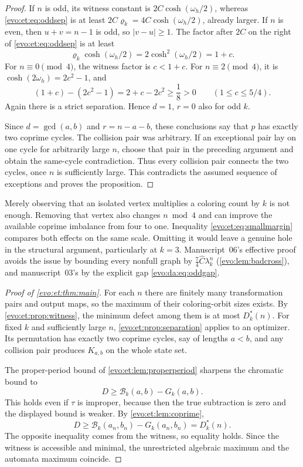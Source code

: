 \documentclass[11pt,a4paper]{article}
\numberwithin{equation}{section}
\theoremstyle{definition}
\theoremstyle{remark}
\newcommand{\Bip}{\mathcal B}
\begin{document}
\begin{proof}
If $n$ is odd, its witness constant is $2C\cosh(\omega_h/2)$, whereas
\eqref{evo:et:eq:oddsep} is at least $2C\varrho_k=4C\cosh(\omega_h/2)$, already
larger. If $n$ is even, then $u+v=n-1$ is odd, so $|v-u|\ge1$. The factor after
$2C$ on the right of \eqref{evo:et:eq:oddsep} is at least
\[
 \varrho_k\cosh(\omega_h/2)=2\cosh^2(\omega_h/2)=1+c.
\]
For $n\equiv0\pmod4$, the witness factor is $c<1+c$. For $n\equiv2\pmod4$, it
is $\cosh(2\omega_h)=2c^2-1$, and
\begin{equation}\label{evo:et:eq:smallmargin}
 (1+c)-(2c^2-1)=2+c-2c^2\ge\frac18>0
 \qquad(1\le c\le5/4).
\end{equation}
Again there is a strict separation. Hence $d=1$, $r=0$ also for odd $k$.

Since $d=\gcd(a,b)$ and $r=n-a-b$, these conclusions say that $p$ has exactly
two coprime cycles. The collision pair was arbitrary. If an exceptional pair
lay on one cycle for arbitrarily large $n$, choose that pair in the preceding
argument and obtain the same-cycle contradiction. Thus every collision pair
connects the two cycles, once $n$ is sufficiently large. This contradicts the
assumed sequence of exceptions and proves the proposition.
\end{proof}

\begin{remark}\label{evo:et:rem:margin}
Merely observing that an isolated vertex multiplies a coloring count by $k$
is not enough. Removing that vertex also changes $n\bmod4$ and can improve
the available coprime imbalance from four to one. Inequality
\eqref{evo:et:eq:smallmargin} compares both effects on the same scale.
Omitting it would leave a genuine hole in the structural argument,
particularly at $k=3$. Manuscript~06's effective proof avoids the issue by
bounding every nonfull graph by $\tfrac74\hat C\lambda_k^n$
(\cref{evo:lem:badcross}), and manuscript~03's by the explicit gap
\eqref{evo:da:eq:oddgap}.
\end{remark}

\begin{proof}[Proof of \cref{evo:et:thm:main}]
For each $n$ there are finitely many transformation pairs and output maps, so
the maximum of their coloring-orbit sizes exists. By
\cref{evo:et:prop:witness}, the minimum defect among them is at most
$D^*_k(n)$. For fixed $k$ and sufficiently large $n$,
\cref{evo:et:prop:separation} applies to an optimizer. Its permutation has
exactly two coprime cycles, say of lengths $a<b$, and any collision pair
produces $K_{a,b}$ on the whole state set.

The proper-period bound of \cref{evo:et:lem:properperiod} sharpens the
chromatic bound to
\[
 D\ge\Bip_k(a,b)-G_k(a,b).
\]
This holds even if $\tau$ is improper, because then the true subtraction is
zero and the displayed bound is weaker. By \cref{evo:et:lem:coprime},
\[
 D\ge\Bip_k(a_n,b_n)-G_k(a_n,b_n)=D^*_k(n).
\]
The opposite inequality comes from the witness, so equality holds. Since the
witness is accessible and minimal, the unrestricted algebraic maximum and the
automata maximum coincide.
\end{proof}
\end{document}
